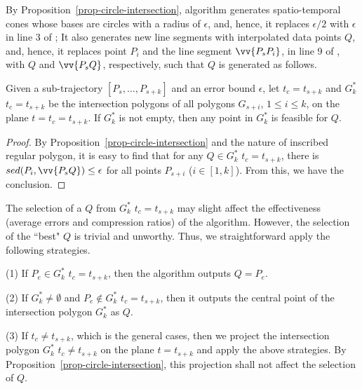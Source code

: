 By Proposition~\ref{prop-circle-intersection}, algorithm \cista generates spatio-temporal cones whose bases are circles with a radius of $\epsilon$,
and, hence, it replaces $\epsilon/2$ with $\epsilon$ in line 3 of \cist;
It also generates new line segments with interpolated data points $Q$, and, hence, it replaces point $P_i$ and the line segment $\vv{P_sP_i}$, in line 9 of \cist, with $Q$ and $\vv{P_sQ}$, respectively, such that $Q$ is generated as follows.


\begin{cor}
Given a sub-trajectory ${[P_s, \ldots, P_{s+k}]}$ and an error bound $\epsilon$, let $t_c=t_{s+k}$ and $G^*_k$ \wrt $t_c=t_{s+k}$ be the intersection polygons of all polygons $G_{s+i}$, $1\le i\le k$, on the plane $t=t_c=t_{s+k}$. If $G^*_k$ is not empty, then any point in $G^*_k$ is feasible for $Q$.
\end{cor}

\begin{proof}
By Proposition~\ref{prop-circle-intersection} and the nature of inscribed regular polygon, it is easy to find that for any $Q \in G^*_k$  \wrt $t_c=t_{s+k}$, there is $sed(P_i, \vv{P_sQ})\le \epsilon$ for all points $P_{s+i}$ ($i \in [1,k]$). From this, we have the conclusion.
\end{proof}

The selection of a $Q$ from $G^*_k$ \wrt $t_c=t_{s+k}$ may slight affect the effectiveness (\eg average errors and compression ratios) of the algorithm. However, the selection of the ``best" $Q$ is trivial and unworthy. Thus, we straightforward apply the following strategies.

\sstab (1) If $P_e \in G^*_k$ \wrt $t_c=t_{s+k}$, then the algorithm outputs $Q=P_e$.

\sstab (2) If $G^*_k \ne \emptyset$ and $P_e \not\in G^*_k$ \wrt $t_c=t_{s+k}$, then it outputs the central point of the intersection polygon $G^*_k$ as $Q$.

\sstab (3) If $t_c \ne t_{s+k}$, which is the general cases, then we project the intersection polygon $G^*_k$ \wrt $t_c \ne t_{s+k}$ on the plane $t=t_{s+k}$ and apply the above strategies. By Proposition~\ref{prop-circle-intersection}, this projection shall not affect the selection of $Q$.

